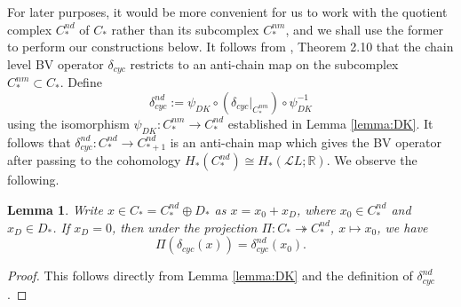 \documentclass[a4paper]{article}
\newtheorem{lemma}[theorem]{Lemma}
\numberwithin{equation}{section}
\begin{document}
For later purposes, it would be more convenient for us to work with the quotient complex $C_\ast^\mathit{nd}$ of $C_\ast$ rather than its subcomplex $C_\ast^\mathit{nm}$, and we shall use the former to perform our constructions below. It follows from \cite{ki1}, Theorem 2.10 that the chain level BV operator $\delta_\mathit{cyc}$ restricts to an anti-chain map on the subcomplex $C_\ast^\mathit{nm}\subset C_\ast$. Define
\begin{equation}\label{eq:dnd}
\delta_\mathit{cyc}^\mathit{nd}:=\psi_\mathit{DK}\circ(\delta_\mathit{cyc}|_{C_\ast^\mathit{nm}})\circ\psi_\mathit{DK}^{-1}
\end{equation}
using the isomorphism $\psi_\mathit{DK}:C_\ast^\mathit{nm}\rightarrow C_\ast^\mathit{nd}$ established in Lemma \ref{lemma:DK}. It follows that $\delta_\mathit{cyc}^\mathit{nd}:C_\ast^\mathit{nd}\rightarrow C_{\ast+1}^\mathit{nd}$ is an anti-chain map which gives the BV operator after passing to the cohomology $H_\ast(C_\ast^\mathit{nd})\cong H_\ast(\mathcal{L}L;\mathbb{R})$. We observe the following.

\begin{lemma}\label{lemma:delta}
Write $x\in C_\ast=C_\ast^\mathit{nd}\oplus D_\ast$ as $x=x_0+x_D$, where $x_0\in C_\ast^\mathit{nd}$ and $x_D\in D_\ast$. If $x_D=0$, then under the projection $\Pi:C_\ast\twoheadrightarrow C_\ast^\mathit{nd}$, $x\mapsto x_0$, we have
\begin{equation}
\Pi\left(\delta_\mathit{cyc}(x)\right)=\delta_\mathit{cyc}^\mathit{nd}\left(x_0\right).
\end{equation}
\end{lemma}
\begin{proof}
This follows directly from Lemma \ref{lemma:DK} and the definition of $\delta_\mathit{cyc}^\mathit{nd}$.
\end{proof}
\end{document}
